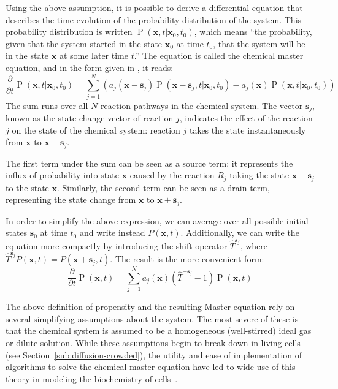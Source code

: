 \documentclass[english,letterpaper,12pt]{article}
\renewcommand{\vec}[1]{\ensuremath{\mathbf{#1}}}
\DeclareMathOperator{\Prob}{P}
\begin{document}
\begin{doublespacing}
Using the above assumption, it is possible to derive a differential equation that describes the time evolution of the probability distribution of the system. This probability distribution is written $\Prob(\vec{x}, t | \vec{x}_0, t_0)$, which means ``the probability, given that the system started in the state $\vec{x}_0$ at time $t_0$, that the system will be in the state $\vec{x}$ at some later time $t$.'' The equation is called the chemical master equation, and in the form given in \cite{gillespie-ssa}, it reads:
\begin{equation}
    \frac{\partial}{\partial t} \Prob(\vec{x}, t | \vec{x}_0, t_0) = \sum_{j=1}^N \left( a_j (\vec{x} - \vec{s}_j) \Prob(\vec{x} - \vec{s}_j, t | \vec{x}_0, t_0) - a_j(\vec{x}) \Prob(\vec{x}, t | \vec{x}_0, t_0) \right)
    \label{eq:master-eqn-gillespie}
\end{equation}
The sum runs over all $N$ reaction pathways in the chemical system. The vector $\vec{s}_j$, known as the state-change vector of reaction $j$, indicates the effect of the reaction $j$ on the state of the chemical system: reaction $j$ takes the state instantaneously from $\vec{x}$ to $\vec{x} + \vec{s}_j$.

The first term under the sum can be seen as a source term; it represents the influx of probability into state $\vec{x}$ caused by the reaction $R_j$ taking the state $\vec{x} - \vec{s}_j$ to the state $\vec{x}$. Similarly, the second term can be seen as a drain term, representing the state change from $\vec{x}$ to $\vec{x} + \vec{s}_j$.

In order to simplify the above expression, we can average over all possible initial states $\vec{s}_0$ at time $t_0$ and write instead $P(\vec{x}, t)$. Additionally, we can write the equation more compactly by introducing the shift operator $\hat{T}^{\vec{s}_j}$, where $\hat{T}^{\vec{s}_j} P(\vec{x}, t) = P(\vec{x} + \vec{s}_j, t)$. The result is the more convenient form:
\begin{equation}
    \frac{\partial}{\partial t} \Prob(\vec{x}, t) = \sum_{j=1}^N a_j(\vec{x})(\hat{T}^{-\vec{s}_j} - 1)\Prob(\vec{x}, t)
    \label{eq:master-eqn}
\end{equation}

The above definition of propensity and the resulting Master equation rely on several simplifying assumptions about the system. The most severe of these is that the chemical system is assumed to be a homogeneous (well-stirred) ideal gas or dilute solution.  While these assumptions begin to break down in living cells (see Section~\ref{sub:diffusion-crowded}), the utility and ease of implementation of algorithms to solve the chemical master equation have led to wide use of this theory in modeling the biochemistry of cells~\cite{we-chemkin}\cite{stoch-sys-bio}.


\end{doublespacing}
\end{document}
